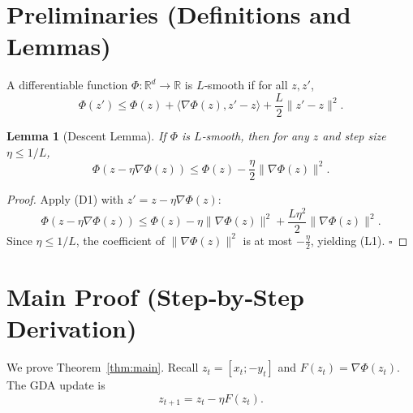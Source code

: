\documentclass{article}
\newtheorem{lemma}{Lemma}
\newcommand{\R}{\mathbb{R}}
\begin{document}
\newpage
\section*{Preliminaries (Definitions and Lemmas)}
\begin{definition}
A differentiable function $\Phi:\R^{d}\!\to\!\R$ is $L$‑smooth if for all $z,z'$,
\[
\Phi(z')\le \Phi(z)+\langle\nabla\Phi(z),z'-z\rangle+\frac{L}{2}\|z'-z\|^{2}.
\tag{D1}
\]
\end{definition}

\begin{lemma}[Descent Lemma]\label{lem:descent}
If $\Phi$ is $L$‑smooth, then for any $z$ and step size $\eta\le 1/L$,
\[
\Phi(z-\eta\nabla\Phi(z))
\le \Phi(z)-\frac{\eta}{2}\|\nabla\Phi(z)\|^{2}.
\tag{L1}
\]
\end{lemma}
\begin{proof}
Apply (D1) with $z'=z-\eta\nabla\Phi(z)$:
\[
\Phi(z-\eta\nabla\Phi(z))
\le \Phi(z)-\eta\|\nabla\Phi(z)\|^{2}
      +\frac{L\eta^{2}}{2}\|\nabla\Phi(z)\|^{2}.
\]
Since $\eta\le 1/L$, the coefficient of $\|\nabla\Phi(z)\|^{2}$ is at most $-\frac{\eta}{2}$, yielding (L1). \hfill $\square$
\end{proof}

\section*{Main Proof (Step‑by‑Step Derivation)}
We prove Theorem~\ref{thm:main}. Recall $z_t=[x_t;-y_t]$ and $F(z_t)=\nabla\Phi(z_t)$. The GDA update is
\[
z_{t+1}=z_t-\eta F(z_t).
\tag{P1}
\]
\end{document}
